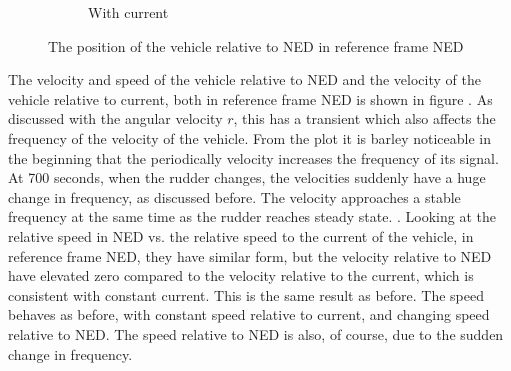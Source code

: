 \begin{figure}[!ht]
\begin{subfigure}[b]{0.45\textwidth}
		\caption{With current}
		\label{fig:2_6_pos_current}
	\end{subfigure}
	\caption{The position of the vehicle relative to NED  in reference frame NED}
	\label{fig:2_6_pos}
\end{figure}

The velocity and speed of the vehicle relative to NED and the velocity of the vehicle relative to current, both in reference frame NED is shown in figure . As discussed with the angular velocity $r$, this has a transient which also affects the frequency of the velocity of the vehicle. From the plot it is barley noticeable in the beginning that the periodically velocity increases the frequency of its signal. At 700 seconds, when the rudder changes, the velocities suddenly have a huge change in frequency, as discussed before. The velocity approaches a stable frequency at the same time as the rudder reaches steady state. . Looking at the relative speed in NED vs. the relative speed to the current of the vehicle, in reference frame NED, they have similar form, but the velocity relative to NED have elevated zero compared to the velocity relative to the current, which is consistent with constant current. This is the same result as before. The speed behaves as before, with constant speed relative to current, and changing speed relative to NED. The speed relative to NED is also, of course, due to the sudden change in frequency.

